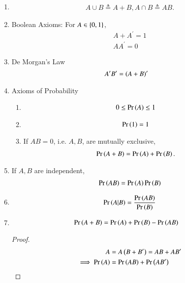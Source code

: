 \begin{enumerate}[label=\thesubsection.\arabic*,ref=\thesubsection.\theenumi]
	\item
\begin{align}
	A \cup B \triangleq A+B, A \cap B \triangleq AB.
\end{align}
	\item  Boolean Axioms:  For $A \in \left\{0,1\right\}$,
\begin{align}
	A + A^{\prime} = 1
	\\
	A  A^{\prime} = 0
\end{align}
\item De Morgan's Law
\begin{align}
A^{\prime}B^{\prime} &=  \brak{A+B}^{\prime}
	\label{eq:demorgan}
\end{align}
\item Axioms of Probability
	\begin{enumerate}
\item 
\begin{align}
	0 \le \pr{A} \le 1	
	\label{eq:axiom-pos}
\end{align}
\item 
\begin{align}
	\pr{1} =1	
	\label{eq:axiom-one}
\end{align}
\item If $AB = 0$, i.e. $A, B$, are mutually exclusive,
\begin{align}
	\pr{A+B} = \pr{A} + \pr{B}.
\label{eq:axiom_exclusive}
\end{align}
	\end{enumerate}
\item If $A, B$ are independent,
\begin{align}
	\pr{AB} = \pr{A}\pr{B}
\label{eq:axiom-ind}
\end{align}
\item 
\begin{align}
	\Pr\left(A | B\right) = \frac{\Pr\left(AB\right)}{\Pr\left(B\right)}
\end{align}
\item 
	\begin{align}
\pr{A+B} &= \pr{A} + \pr{B} - \pr{AB} 
\label{eq:axiom_sum_AB}
\end{align}
		\begin{proof}
\begin{align}
	A &= A \brak{B+B^{\prime}} =  AB + AB^{\prime}
\\
	\implies \pr{A} &=  \pr{AB} + \pr{AB^{\prime}}

\end{align}
\end{proof}
\end{enumerate}
